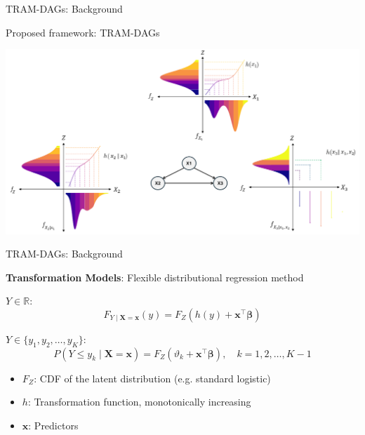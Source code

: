 \documentclass[onlytextwidth,english]{beamer}\usepackage[]{graphicx}\usepackage[]{xcolor}
\begin{document}
\begin{frame}{TRAM-DAGs: Background}

Proposed framework: TRAM-DAGs \citep{sick2025}

  \centering
  \includegraphics[width=1\linewidth]{img/TRAM_DAG.png}
\end{frame}



\begin{frame}{TRAM-DAGs: Background}

\textbf{Transformation Models}: Flexible distributional regression method \citep{hothorn2014}

\vspace{0.4cm}

 $Y \in \mathbb{R}$: 
\[
F_{Y \mid \mathbf{X} = \mathbf{x}}(y) = F_Z(h(y) + \mathbf{x}^\top \boldsymbol{\beta})
\]

 $Y \in \{y_1, y_2, \ldots, y_K\}$: 
\[
P(Y \leq y_k \mid \mathbf{X} = \mathbf{x}) = F_Z(\vartheta_k + \mathbf{x}^\top \boldsymbol{\beta}), \quad k = 1, 2, \ldots, K - 1
\]

\vspace{0.4cm}

\begin{itemize}
    \item $F_Z$: CDF of the latent distribution (e.g. standard logistic)
    \item $h$: Transformation function, monotonically increasing
    \item $\mathbf{x}$: Predictors
\end{itemize}

\end{frame}
\end{document}
